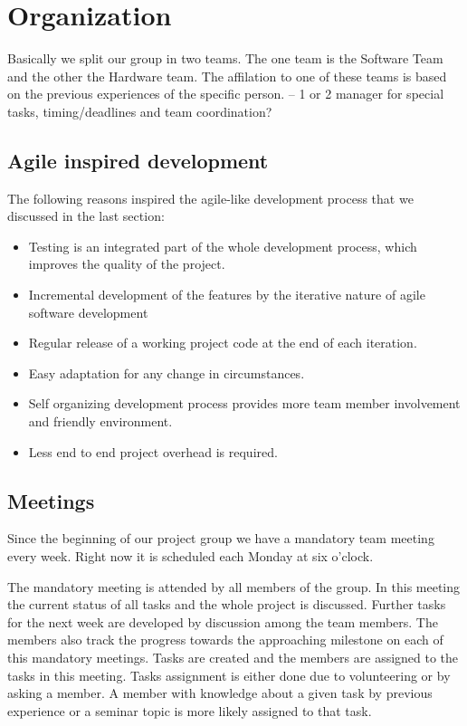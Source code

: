 \chapter{Organization}
Basically we split our group in two teams. The one team is the Software Team and the other the Hardware team.
The affilation to one of these teams is based on the previous experiences of the specific person.
-- 1 or 2 manager for special tasks, timing/deadlines and team coordination?

\section{Agile inspired development}
The following reasons inspired the agile-like development process that we discussed in the last section:

\begin{itemize}
\item Testing is an integrated part of the whole development process, which improves the
quality of the project.
\item Incremental development of the features by the iterative nature of agile software
development
\item Regular release of a working project code at the end of each iteration.
\item Easy adaptation for any change in circumstances.
\item Self organizing development process provides more team member involvement and
friendly environment.
\item Less end to end project overhead is required.
\end{itemize}

\section{Meetings}
Since the beginning of our project group we have a mandatory team meeting every week.
Right now it is scheduled each Monday at six o'clock.

The mandatory meeting is attended by all members of the group.
In this meeting the current status of all tasks and the whole project is discussed.
Further tasks for the next week are developed by discussion among the team members.
The members also track the progress towards the approaching milestone on each of this mandatory meetings.
Tasks are created and the members are assigned to the tasks in this meeting. Tasks assignment is either done due to volunteering or by asking a member.
A member with knowledge about a given task by previous experience or a seminar topic is  more likely assigned to that task.

